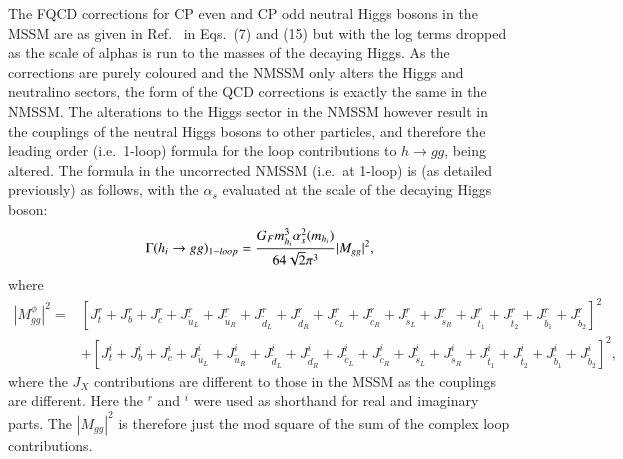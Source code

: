 \documentclass[final,3p,times]{elsarticle}
\begin{document}
The FQCD corrections for CP even and CP odd neutral Higgs bosons in the MSSM
are as given in Ref.~\cite{Djouadi:1996} in Eqs.~(7) and (15) but with the log terms dropped as the scale of alphas is run to the masses of the decaying Higgs.
As the corrections are purely coloured and the NMSSM only alters the Higgs and neutralino sectors, the form of the QCD corrections is exactly the same in the NMSSM\@. The alterations to the Higgs sector in the NMSSM however result in the couplings of the neutral Higgs bosons to other particles, and therefore the leading order (i.e.\ 1-loop) formula for the loop contributions to $h \rightarrow gg$, being altered. The formula in the uncorrected NMSSM (i.e.\ at 1-loop) is (as detailed previously) as follows, with the $\alpha_s$ evaluated at the scale of the decaying Higgs boson:
\begin{equation} \label{hggNMSSMnorm}
\Gamma(h_{i} \rightarrow gg)_{1-loop} = {G_{F} m_{h_i}^3 \alpha_{s}^2 (m_{h_i}) \over 64 \sqrt{2} \pi^3} |M_{gg}|^2,
\end{equation}
where
\begin{equation}
\begin{aligned}
|M_{gg}^\phi|^2 = & [J_{t}^{r} + J_{b}^{r} + J_{c}^{r} + J_{\tilde{u}_L}^{r} + J_{\tilde{u}_R}^{r} + J_{\tilde{d}_L}^{r} + J_{\tilde{d}_R}^{r} + J_{\tilde{c}_L}^{r} + J_{\tilde{c}_R}^{r} + J_{\tilde{s}_L}^{r} + J_{\tilde{s}_R}^{r} + J_{\tilde{t}_1}^{r} + J_{\tilde{t}_2}^{r} + J_{\tilde{b}_1}^{r} + J_{\tilde{b}_2}^{r}]^2 \\ & + [J_{t}^{i} + J_{b}^{i} + J_{c}^{i} + J_{\tilde{u}_L}^{i} + J_{\tilde{u}_R}^{i} + J_{\tilde{d}_L}^{i} + J_{\tilde{d}_R}^{i} + J_{\tilde{c}_L}^{i} + J_{\tilde{c}_R}^{i} + J_{\tilde{s}_L}^{i} + J_{\tilde{s}_R}^{i} + J_{\tilde{t}_1}^{i} + J_{\tilde{t}_2}^{i} + J_{\tilde{b}_1}^{i} + J_{\tilde{b}_2}^{i}]^2,
\end{aligned}
\end{equation}
where the $J_{X}$ contributions are different to those in the MSSM as the
couplings are different. Here the $^{r}$ and $^{i}$ were used as shorthand for
real and imaginary parts. The $|M_{gg}|^2$ is therefore just the mod square of
the sum of the complex loop contributions. 
\end{document}
